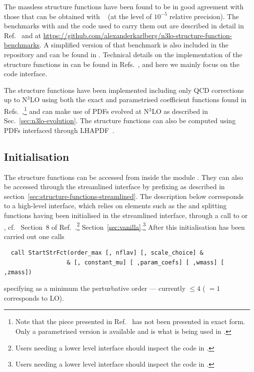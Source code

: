 The massless structure functions have been found to be in good
agreement with those that can be obtained with
\APFELPP{}~\cite{Bertone:2013vaa,Bertone:2017gds} (at the level of
$10^{-5}$ relative precision).
%
The benchmarks with \APFELPP{} and the code used to carry them out are
described in detail in Ref.~\cite{Bertone:2024dpm} and at
\url{https://github.com/alexanderkarlberg/n3lo-structure-function-benchmarks}. A
simplified version of that benchmark is also included in the \hoppet{}
repository and can be found in
.
%
Technical details on the implementation of the structure functions in
\hoppet can be found in
Refs.~\cite{Dreyer:2016vbc,Karlberg:2016zik,Bertone:2024dpm}, and here
we mainly focus on the code interface.

The structure functions have been implemented including only QCD
corrections up to N$^3$LO using both the exact and parametrised
coefficient functions found in
Refs.~\cite{vanNeerven:1999ca,vanNeerven:2000uj,Moch:2004xu,Vermaseren:2005qc,Moch:2008fj,Davies:2016ruz,Blumlein:2022gpp},\footnote{Note
that the piece presented in Ref.~\cite{Davies:2016ruz} has not been
presented in exact form. Only a parametrised version is available and
is what is being used in \hoppet.}  and can make use of PDFs evolved
at N$^3$LO as described in Sec.~\ref{sec:n3lo-evolution}. The
structure functions can also be computed using PDFs interfaced through
LHAPDF~\cite{LHAPDF}.

\subsection{Initialisation}
\label{sec:structure-funcs-init}

The structure functions can be accessed from inside the module
. They can also be accessed through the
streamlined interface by prefixing  as described in
section~\ref{sec:structure-functions-streamlined}.
%
The description below corresponds to a high-level interface, which
relies on elements such as the  and splitting functions
having been initialised in the streamlined interface, through a call
to  or , cf.\
\ifreleasenote
Section~8 of Ref.~\cite{Salam:2008qg}.\footnote{Users needing a lower level
  interface should inspect the code in .}
\else
Section~\ref{sec:vanilla}.\footnote{Users needing a lower level
  interface should inspect the code in .}
\fi
%
After this initialisation has been carried out one calls
\begin{lstlisting}
  call StartStrFct(order_max [, nflav] [, scale_choice] &
                  & [, constant_mu] [ ,param_coefs] [ ,wmass] [ ,zmass])
\end{lstlisting}
specifying as a minimum the perturbative order --- currently
 $ \le 4$ (\ttt{order\_max} $ =1$ corresponds to LO).


